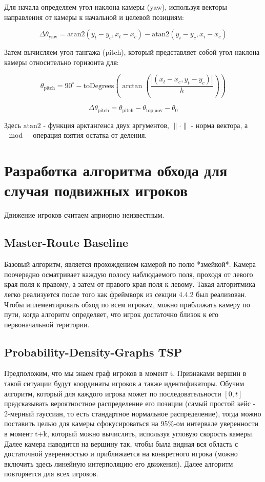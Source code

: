    Для начала определяем угол наклона камеры (yaw), используя векторы направления от камеры к начальной и целевой позициям:

    $$
   \Delta \theta_{\text{yaw}} = \text{atan2}(y_t - y_c, x_t - x_c) - \text{atan2}(y_i - y_c, x_i - x_c)
    $$

   Затем вычисляем угол тангажа (pitch), который представляет собой угол наклона камеры относительно горизонта для:


    $$
   \theta_{\text{pitch}} = 90^\circ - \text{toDegrees}(\arctan( \frac{|(x_t-x_c, y_t-y_c) | }{h}) )
    $$

    $$
   \Delta \theta_{\text{pitch}} = \theta_{\text{pitch}} - \theta_{\text{top\_aov}} - \theta_{0}
    $$

Здесь  $ \text{atan2}  $ - функция арктангенса двух аргументов,  $ \| \cdot \|  $ - норма вектора, а  $\mod$ - операция взятия остатка от деления.




\section{Разработка алгоритма обхода для случая подвижных игроков}
 
 Движение игроков считаем априорно неизвестным. 

\subsection{Master-Route Baseline}
Базовый алгоритм, является прохождением камерой по полю *змейкой*. Камера поочередно осматривает каждую полосу наблюдаемого поля, проходя от левого края поля к правому, а затем от правого края поля к левому. Такая алгоритмика легко реализуется после того как фреймворк из секции 4.4.2 был реализован. Чтобы иплементировать обход по всем игрокам, можно приближать камеру по пути, когда алгоритм определяет, что игрок достаточно близок к его первоначальной територии.


\subsection{Probability-Density-Graphs TSP}
Предположим, что мы знаем граф игроков в момент t. Признаками вершин в такой ситуации будут координаты игроков а также идентификаторы. Обучим алгоритм, который для каждого игрока может по последовательности $[0,t]$ предсказывать вероятностное распределение его позиции (самый простой кейс - 2-мерный гауссиан, то есть стандартное нормальное распределение), тогда можно поставить целью для камеры сфокусироваться на 95\%-ом интервале уверенности в момент t+k, который можно вычислить, используя угловую скорость камеры. Далее камера наводится на вершину так, чтобы была видная вся область с достаточной уверенностью и приближается на конкретного игрока (можно включить здесь линейную интерполяцию его движения). Далее алгоритм повторяется для всех игроков.